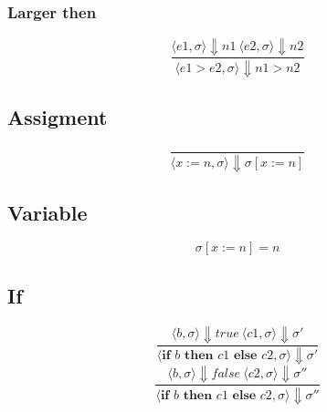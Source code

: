 \documentclass[12pt]{article}
\begin{document}
                \subsubsection{Larger then}
                    \begin{equation}  
                        \frac{\langle e1, \sigma \rangle\Downarrow n1 \: \langle e2, \sigma \rangle\Downarrow n2}
                        {\langle e1 > e2, \sigma \rangle\Downarrow n1 > n2}
                    \end{equation}
                    
            \subsection{Assigment}
                \begin{equation}  
                        \frac{}
                        {\langle x := n, \sigma \rangle\Downarrow \sigma [ x := n ]}
                \end{equation}
                
            \subsection{Variable}
                \begin{equation}  
                        \sigma [ x := n ] = n
                \end{equation}
                
            \subsection{If}
                \begin{equation}  
                    \frac{\langle b, \sigma \rangle\Downarrow true \: \langle c1, \sigma \rangle\Downarrow \sigma'}
                    {\langle \textbf{if } b \textbf{ then } c1 \textbf{ else } c2, \sigma \rangle\Downarrow \sigma'}
                \end{equation}
                \begin{equation}  
                    \frac{\langle b, \sigma \rangle\Downarrow false \: \langle c2, \sigma \rangle\Downarrow \sigma''}
                    {\langle \textbf{if } b \textbf{ then } c1 \textbf{ else } c2, \sigma \rangle\Downarrow \sigma''}
                \end{equation}
                
\end{document}
